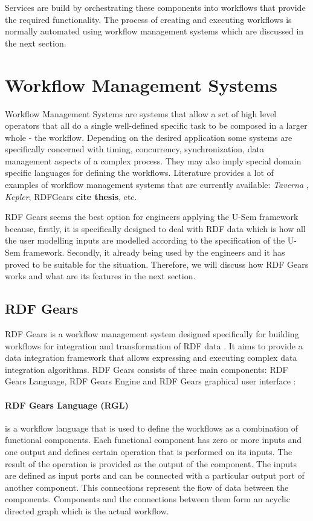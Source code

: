 Services are build by orchestrating these components into workflows that provide the required functionality. The process of creating and executing workflows is normally automated using workflow management systems which are discussed in the next section.

\section{Workflow Management Systems}
Workflow Management Systems are systems that allow a set of high level operators that all do a single well-defined specific task to be composed in a larger whole - the workflow. Depending on the desired application some systems are specifically concerned with  timing, concurrency, synchronization, data management aspects of a complex process. They may also imply special domain specific languages for defining the workflows. Literature provides a lot of examples of workflow management systems that are currently available: \textit{Taverna} \cite{Hull06}, \textit{Kepler}, RDFGears \textbf{cite thesis}, etc.

RDF Gears seems the best option for engineers applying the U-Sem framework because, firstly, it is specifically designed to deal with RDF data which is how all the user modelling inputs are modelled according to the specification of the U-Sem framework. Secondly, it already being used by the engineers and it has proved to be suitable for the situation. Therefore, we will discuss how RDF Gears works and what are its features in the next section.

\subsection{RDF Gears}

RDF Gears is a workflow management system designed specifically for building workflows for integration and transformation of RDF data \cite{Feliksik11}. It aims to provide a data integration framework that allows expressing and executing complex data integration algorithms. RDF Gears consists of three main components: RDF Gears Language, RDF Gears Engine and RDF Gears graphical user interface \cite{Feliksik11}:

\paragraph{RDF Gears Language (RGL)} is a workflow language that is used to define the workflows as a combination of functional components. Each functional component has zero or more inputs and one output and defines certain operation that is performed on its inputs. The result of the operation is provided as the output of the component. The inputs are defined as input ports and can be connected with a particular output port of another component. This connections represent the flow of data between the components. Components and the connections between them form an acyclic directed graph which is the actual workflow.

